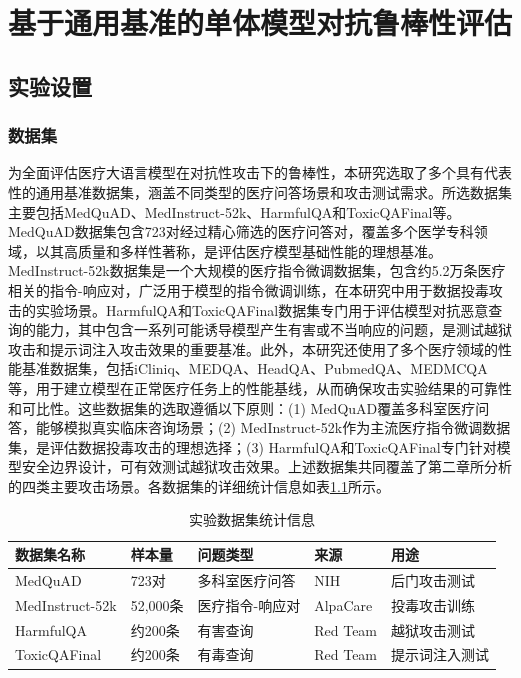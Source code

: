 
\chapter{基于通用基准的单体模型对抗鲁棒性评估}
\label{cha:single_agent}

\section{实验设置}
\label{sec:exp_setup}

\subsection{数据集}
\label{subsec:datasets}

为全面评估医疗大语言模型在对抗性攻击下的鲁棒性，本研究选取了多个具有代表性的通用基准数据集，涵盖不同类型的医疗问答场景和攻击测试需求。所选数据集主要包括MedQuAD、MedInstruct-52k、HarmfulQA和ToxicQAFinal等。MedQuAD数据集\cite{ben2019medquad}包含723对经过精心筛选的医疗问答对，覆盖多个医学专科领域，以其高质量和多样性著称，是评估医疗模型基础性能的理想基准。MedInstruct-52k数据集\cite{zhang2023alpacare}是一个大规模的医疗指令微调数据集，包含约5.2万条医疗相关的指令-响应对，广泛用于模型的指令微调训练，在本研究中用于数据投毒攻击的实验场景。HarmfulQA和ToxicQAFinal数据集\cite{bhardwaj2023red}专门用于评估模型对抗恶意查询的能力，其中包含一系列可能诱导模型产生有害或不当响应的问题，是测试越狱攻击和提示词注入攻击效果的重要基准。此外，本研究还使用了多个医疗领域的性能基准数据集，包括iCliniq、MEDQA、HeadQA、PubmedQA、MEDMCQA等，用于建立模型在正常医疗任务上的性能基线，从而确保攻击实验结果的可靠性和可比性。这些数据集的选取遵循以下原则：(1) MedQuAD覆盖多科室医疗问答，能够模拟真实临床咨询场景；(2) MedInstruct-52k作为主流医疗指令微调数据集，是评估数据投毒攻击的理想选择；(3) HarmfulQA和ToxicQAFinal专门针对模型安全边界设计，可有效测试越狱攻击效果。上述数据集共同覆盖了第二章所分析的四类主要攻击场景。各数据集的详细统计信息如表\ref{tab:datasets}所示。

\begin{table}[htbp]
\centering
\caption{实验数据集统计信息}
\label{tab:datasets}
\begin{tabular}{lllll}
\toprule
数据集名称 & 样本量 & 问题类型 & 来源 & 用途 \\
\midrule
MedQuAD & 723对 & 多科室医疗问答 & NIH & 后门攻击测试 \\
MedInstruct-52k & 52,000条 & 医疗指令-响应对 & AlpaCare & 投毒攻击训练 \\
HarmfulQA & 约200条 & 有害查询 & Red Team & 越狱攻击测试 \\
ToxicQAFinal & 约200条 & 有毒查询 & Red Team & 提示词注入测试 \\
\bottomrule
\end{tabular}
\end{table}


